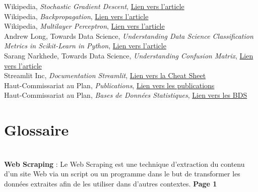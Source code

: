 \documentclass[a4paper,french,12pt]{article}
\begin{document}
\begin{thebibliography}{9}
    Wikipedia, \textit{Stochastic Gradient Descent}, \href{https://en.wikipedia.org/wiki/Stochastic_gradient_descent}{Lien vers l'article}\\
    
    Wikipedia, \textit{Backpropagation}, \href{https://en.wikipedia.org/wiki/Backpropagation}{Lien vers l'article}\\
    
    Wikipedia, \textit{Multilayer Perceptron}, \href{https://en.wikipedia.org/wiki/Multilayer_perceptron}{Lien vers l'article}\\
    
    Andrew Long, Towards Data Science, \textit{Understanding Data Science Classification Metrics in Scikit-Learn in Python}, \href{https://towardsdatascience.com/understanding-data-science-classification-metrics-in-scikit-learn-in-python-3bc336865019}{Lien vers l'article}\\
    
    Sarang Narkhede, Towards Data Science, \textit{Understanding Confusion Matrix}, \href{https://towardsdatascience.com/understanding-confusion-matrix-a9ad42dcfd62}{Lien vers l'article}\\
    
    Streamlit Inc, \textit{Documentation Streamlit}, \href{https://docs.streamlit.io/library/cheatsheet}{Lien vers la Cheat Sheet}\\    
    
    Haut-Commissariat au Plan, \textit{Publications}, \href{https://www.hcp.ma/downloads/}{Lien vers les publications}\\

    Haut-Commissariat au Plan, \textit{Bases de Données Statistiques}, \href{http://bds.hcp.ma/sectors}{Lien vers les BDS}\\

\end{thebibliography}
\endgroup

\newpage

\section{Glossaire}
\label{sec:Glossaire}

~\\

\textbf{Web Scraping} : Le Web Scraping est une technique d'extraction du contenu d'un site Web via un script ou un programme dans le but de transformer les données extraites afin de les utiliser dans d'autres contextes. \textbf{Page 1}\\
\end{document}

